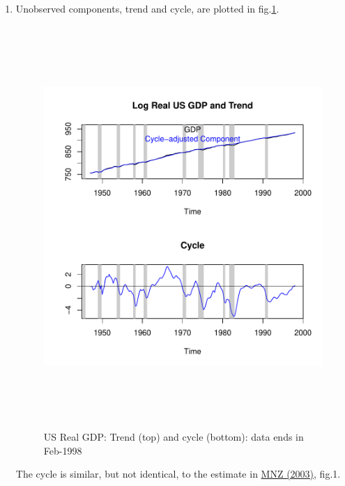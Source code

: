 \documentclass[a4paper]{book}
\begin{document}
\begin{enumerate}
\item Unobserved components, trend and cycle, are plotted in fig.\ref{z_us_real_log_gdp_comp}.
\begin{figure}[H]\begin{center}\includegraphics[height=6in, width=6in]{z_us_real_log_gdp_comp}\caption{US Real GDP: Trend (top) and cycle (bottom): data ends in Feb-1998\label{z_us_real_log_gdp_comp}}\end{center}\end{figure}The cycle is similar, but not identical, to the estimate in \href{https://www.dropbox.com/s/1qn5h7s02c86j8i/mnz03.pdf?dl=0}{MNZ (2003)}, fig.1. 
\end{enumerate}
\end{document}

